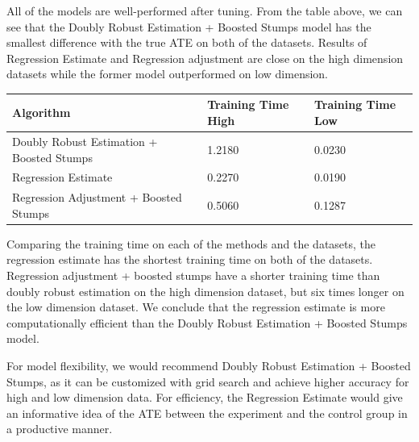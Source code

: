\documentclass[]{article}
\begin{document}
All of the models are well-performed after tuning. From the table above,
we can see that the Doubly Robust Estimation + Boosted Stumps model has
the smallest difference with the true ATE on both of the datasets.
Results of Regression Estimate and Regression adjustment are close on
the high dimension datasets while the former model outperformed on low
dimension.

\begin{longtable}[]{@{}lll@{}}
\toprule
Algorithm & Training Time High & Training Time Low\tabularnewline
\midrule
\endhead
Doubly Robust Estimation + Boosted Stumps & 1.2180 &
0.0230\tabularnewline
Regression Estimate & 0.2270 & 0.0190\tabularnewline
Regression Adjustment + Boosted Stumps & 0.5060 & 0.1287\tabularnewline
\bottomrule
\end{longtable}

Comparing the training time on each of the methods and the datasets, the
regression estimate has the shortest training time on both of the
datasets. Regression adjustment + boosted stumps have a shorter training
time than doubly robust estimation on the high dimension dataset, but
six times longer on the low dimension dataset. We conclude that the
regression estimate is more computationally efficient than the Doubly
Robust Estimation + Boosted Stumps model.

For model flexibility, we would recommend Doubly Robust Estimation +
Boosted Stumps, as it can be customized with grid search and achieve
higher accuracy for high and low dimension data. For efficiency, the
Regression Estimate would give an informative idea of the ATE between
the experiment and the control group in a productive manner.
\end{document}

